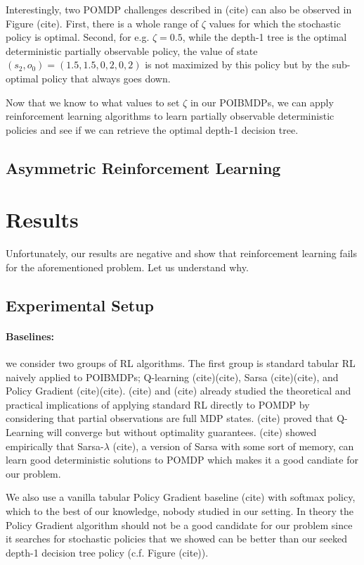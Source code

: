Interestingly, two POMDP challenges described in (cite) can also be observed in Figure (cite). 
First, there is a whole range of $\zeta$ values for which the stochastic policy is optimal.
Second, for e.g. $\zeta=0.5$, while the depth-1 tree is the optimal deterministic partially observable policy, the value of state $(s_2, o_0) = (1.5, 1.5, 0, 2, 0, 2)$ is not maximized by this policy but by the sub-optimal policy that always goes down.

Now that we know to what values to set $\zeta$ in our POIBMDPs, we can apply reinforcement learning algorithms to learn partially observable deterministic policies and see if we can retrieve the optimal depth-1 decision tree.
\subsection{Asymmetric Reinforcement Learning}

\section{Results}

Unfortunately, our results are negative and show that reinforcement learning fails for the aforementioned problem. Let us understand why.

\subsection{Experimental Setup}

\paragraph{Baselines:} we consider two groups of RL algorithms. The first group is standard tabular RL naively applied to POIBMDPs; Q-learning (cite)(cite), Sarsa (cite)(cite), and Policy Gradient (cite)(cite).
(cite) and (cite) already studied the theoretical and practical implications of applying standard RL directly to POMDP by considering that partial observations are full MDP states.
(cite) proved that Q-Learning will converge but without optimality guarantees. 
(cite) showed empirically that Sarsa-$\lambda$ (cite), a version of Sarsa with some sort of memory, can learn good deterministic solutions to POMDP which makes it a good candiate for our problem.

We also use a vanilla tabular Policy Gradient baseline (cite) with softmax policy, which to the best of our knowledge, nobody studied in our setting.
In theory the Policy Gradient algorithm should not be a good candidate for our problem since it searches for stochastic policies that we showed can be better than our seeked depth-1 decision tree policy (c.f. Figure (cite)).

